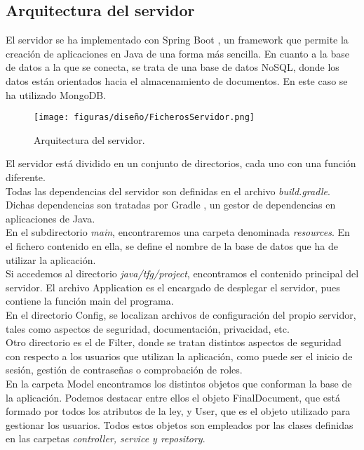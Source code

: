 \subsection{Arquitectura  del servidor}

El servidor se ha implementado con Spring Boot \cite{spring}, un framework que permite la creación de aplicaciones en Java de una forma más sencilla. En cuanto a la base de datos a la que se conecta, se trata de una base de datos NoSQL, donde los datos están orientados hacia el almacenamiento de documentos. En este caso se ha utilizado MongoDB.

\begin{figure}[H]
\centerline{\texttt{[image: figuras/diseño/FicherosServidor.png]}}
\caption{Arquitectura del servidor.}
\label{enlaceArquitecturaServidor}
\end{figure}

El servidor está dividido en un conjunto de directorios, cada uno con una función diferente. 
\\

Todas las dependencias del servidor son definidas en el archivo {\it build.gradle}. Dichas dependencias son tratadas por Gradle \cite{gradle}, un gestor de dependencias en aplicaciones de Java.
\\

En el subdirectorio {\it main}, encontraremos una carpeta denominada {\it resources}. En el fichero contenido en ella, se define el nombre de la base de datos que ha de utilizar la aplicación.
\\

Si accedemos al directorio {\it java/tfg/project}, encontramos el contenido principal del servidor. El archivo Application es el encargado de desplegar el servidor, pues contiene la función main del programa.
\\

En el directorio Config, se localizan archivos de configuración del propio servidor, tales como aspectos de seguridad, documentación, privacidad, etc. 
\\

Otro directorio es el de Filter, donde se tratan distintos aspectos de seguridad con respecto a los usuarios que utilizan la aplicación, como puede ser el inicio de sesión, gestión de contraseñas o comprobación de roles.
\\

En la carpeta Model encontramos los distintos objetos que conforman la base de la aplicación. Podemos destacar entre ellos el objeto FinalDocument, que está formado por todos los atributos de la ley, y User, que es el objeto utilizado para gestionar los usuarios. Todos estos objetos son empleados por las clases definidas en las carpetas {\it controller, service y repository}.
\\

